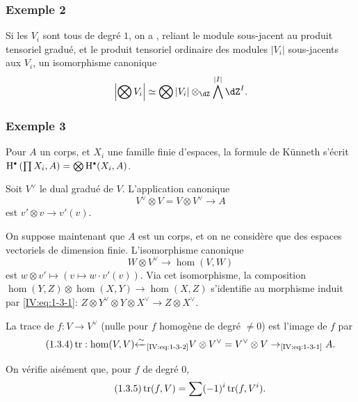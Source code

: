 \subsubsection*{Exemple 2}

Si les $V_i$ sont tous de degré $1$, on a , reliant le module sous-jacent au 
produit tensoriel gradué, et le produit tensoriel ordinaire des modules 
$|V_i|$ sous-jacents aux $V_i$, un isomorphisme canonique 
\[
  \left|\bigotimes V_i\right| \simeq \bigotimes |V_i|\otimes_{\dZ}\bigwedge^{|I|}\dZ^I \text{.}
\]





\subsubsection*{Exemple 3}

Pour $A$ un corps, et $X_i$ une famille finie d'espaces, la formule de 
K\"unneth s'écrit 
$\h^\bullet\left(\prod X_i,A\right) = \bigotimes \h^\bullet(X_i,A)$. 

Soit $V^\vee$ le dual gradué de $V$. L'application canonique 
\begin{equation*}\tag{1.3.1}\label{IV:eq:1-3-1}
  V^\vee\otimes V = V\otimes V^\vee \to A
\end{equation*}
est $v'\otimes v\to v'(v)$. 

On suppose maintenant que $A$ est un corps, et on ne considère que des 
espaces vectoriels de dimension finie. L'isomorphisme canonique 
\begin{equation*}\tag{1.3.2}\label{IV:eq:1-3-2}
  W\otimes V^\vee \to \hom(V,W) 
\end{equation*}
est $w\otimes v'\mapsto \left(v\mapsto w\cdot v'(v)\right)$. Via cet 
isomorphisme, la composition $\hom(Y,Z)\otimes \hom(X,Y)\to \hom(X,Z)$ 
s'identifie au morphisme induit par \eqref{IV:eq:1-3-1}: 
$Z\otimes Y^\vee\otimes Y\otimes X^\vee \to Z\otimes X^\vee$. 

La trace de $f:V\to V^\vee$ (nulle pour $f$ homogène de degré $\ne 0$) est 
l'image de $f$ par 
\begin{equation*}\tag{1.3.4}\label{IV:eq:1-3-4}
  \operatorname{tr}:\hom(V,V) {\xleftarrow\sim}_\text{\eqref{IV:eq:1-3-2}} V\otimes V^\vee = V^\vee \otimes V \to_\text{\eqref{IV:eq:1-3-1}} A .
\end{equation*}

On vérifie aisément que, pour $f$ de degré $0$, 
\begin{equation*}\tag{1.3.5}\label{IV:eq:1-3-5}
  \operatorname{tr}(f,V) = \sum (-1)^i \operatorname{tr}(f,V^i) \text{.}
\end{equation*}

